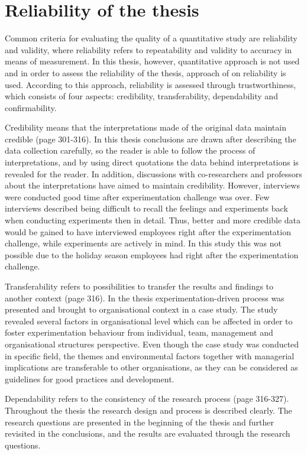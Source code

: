 \section{Reliability of the thesis}
Common criteria for evaluating the quality of a quantitative study are reliability and validity, where reliability refers to repeatability and validity to accuracy in means of measurement. In this thesis, however, quantitative approach is not used and in order to assess the reliability of the thesis, approach of \citet{lincoln1985naturalistic} on reliability is used. According to this approach, reliability is assessed through trustworthiness, which consists of four aspects: credibility, transferability, dependability and confirmability. 

Credibility means that the interpretations made of the original data maintain credible \citep{lincoln1985naturalistic} (page 301-316). In this thesis conclusions are drawn after describing the data collection carefully, so the reader is able to follow the process of interpretations, and by using direct quotations the data behind interpretations is revealed for the reader. In addition, discussions with co-researchers and professors about the interpretations have aimed to maintain credibility. However, interviews were conducted good time after experimentation challenge was over. Few interviews described being difficult to recall the feelings and experiments back when conducting experiments then in detail. Thus, better and more credible data would be gained to have interviewed employees right after the experimentation challenge, while experiments are actively in mind. In this study this was not possible due to the holiday season employees had right after the experimentation challenge. 

Transferability refers to possibilities to transfer the results and findings to another context \citep{lincoln1985naturalistic} (page 316). In the thesis experimentation-driven process was presented and brought to organisational context in a case study. The study revealed several factors in organisational level which can be affected in order to foster experimentation behaviour from individual, team, management and organisational structures perspective. Even though the case study was conducted in specific field, the themes and environmental factors together with managerial implications are transferable to other organisations, as they can be considered as guidelines for good practices and development. 

Dependability refers to the consistency of the research process \citep{lincoln1985naturalistic} (page 316-327). Throughout the thesis the research design and process is described clearly. The research questions are presented in the beginning of the thesis and further revisited in the conclusions, and the results are evaluated through the research questions. 

